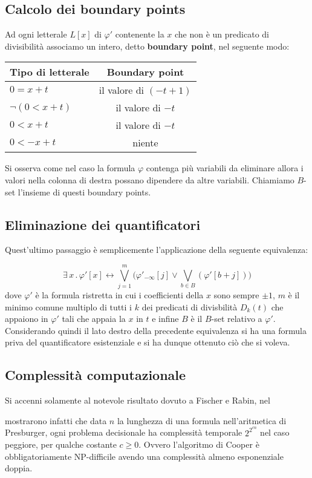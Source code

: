 \documentclass[11pt,letterpaper,twoside]{article}
\begin{document}
\subsection{Calcolo dei boundary points}
Ad ogni letterale $L[x]$ di $\varphi '$ contenente la $x$ che non è un
predicato di divisibilit\`a associamo un intero, detto \textbf{boundary point},
nel seguente modo:

\begin{center}
  \begin{tabular}{ l | c }
    Tipo di letterale & Boundary point \\ \hline
    $0=x+t$ & il valore di $(-t + 1)$ \\
    $\lnot (0 < x+t)$ & il valore di $-t$ \\
    $0 < x + t$ & il valore di $-t$ \\
    $0 < -x + t$ &  niente
  \end{tabular}
\end{center}
Si osserva come nel caso la formula $\varphi$ contenga più variabili da eliminare
allora i valori nella colonna di destra possano dipendere da altre variabili.
Chiamiamo $B$-set l'insieme di questi boundary points.

\subsection{Eliminazione dei quantificatori}
Quest'ultimo passaggio è semplicemente l'applicazione della seguente
equivalenza\autocite{cooper}:

$$ \exists \, x \, . \, \varphi'[x] \longleftrightarrow \bigvee_{j=1}^m \Big(
\varphi'_{- \infty}[j] \lor \bigvee_{b \in B}(\varphi'[b+j]) \Big)$$
dove $\varphi'$ è la formula ristretta in cui i coefficienti della $x$ sono
sempre $\pm 1$, $m$ è il minimo comune multiplo di tutti i $k$ dei predicati
di divisbilit\`a $D_k(t)$ che appaiono in $\varphi'$ tali che appaia la $x$ in
$t$ e infine $B$ \`e il $B$-set relativo a $\varphi'$.
Considerando quindi il lato destro della precedente equivalenza si ha una
formula priva del quantificatore esistenziale e si ha dunque ottenuto ciò che
si voleva.

\subsection{Complessità computazionale}
Si accenni solamente al notevole risultato dovuto a Fischer e
Rabin\autocite{complexity}, nel \date{1974} mostrarono infatti che data $n$ la
lunghezza di una formula nell'aritmetica di Presburger, ogni problema
decisionale ha complessità temporale $2^{2^{cn}}$ nel caso peggiore, per qualche
costante $c \ge 0$. Ovvero l'algoritmo di Cooper è obbligatoriamente
NP-difficile avendo una complessità almeno esponenziale doppia.
\end{document}
